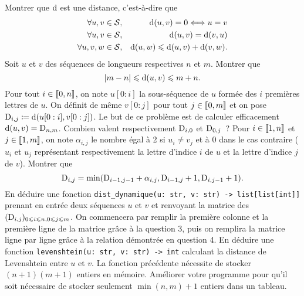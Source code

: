 \documentclass{magnolia}
\begin{document}
\begin{questions}
\question Montrer que ${\rm d}$ est une distance, c'est-à-dire que
  \begin{eqnarray*}
  \forall u,v\in\mathcal{S},& & {\rm d}(u, v) = 0 \ssi u=v\\
  \forall u,v\in\mathcal{S},& & {\rm d}(u, v) = {\rm d}(v, u)\\
  \forall u,v,w\in\mathcal{S},& & {\rm d}(u, w) \leq {\rm d}(u, v) + {\rm d}(v, w).
  \end{eqnarray*}
\question Soit $u$ et $v$ des séquences de longueurs respectives $n$ et $m$. Montrer que
  \[\abs{m-n}\leq {\rm d}(u, v)\leq m + n.\]
\enonce Pour tout $i\in\intere{0}{n}$, on note $u[0:i]$ la sous-séquence de $u$ formée des $i$ premières
  lettres de $u$. On définit de même $v[0:j]$ pour tout $j\in\intere{0}{m}$ et on pose ${\rm D}_{i,j}\defeq
  {\rm d}(u[0:i], v[0:j])$. Le but de ce problème est de calculer efficacement
  ${\rm d}(u,v)={\rm D}_{n, m}$.
\question Combien valent respectivement ${\rm D}_{i, 0}$ et ${\rm D}_{0, j}$~?
\question Pour $i\in\intere{1}{n}$ et $j\in\intere{1}{m}$, on note $\alpha_{i,j}$ le nombre égal à 2 si
  $u_i\neq v_j$ et à 0 dans le cas contraire ($u_i$ et $u_j$ représentant respectivement la lettre d'indice
  $i$ de $u$ et la lettre d'indice $j$ de $v$). Montrer que
  \[{\rm D}_{i, j}=\min({\rm D}_{i-1, j-1}+\alpha_{i,j}, {\rm D}_{i-1, j}+1, {\rm D}_{i, j-1}+1).\]
\question En déduire une fonction \verb!dist_dynamique(u: str, v: str) -> list[list[int]]! prenant
  en entrée deux séquences $u$ et $v$ et renvoyant la matrice des $({\rm D}_{i,j})_{0\leq i\leq n, 0\leq j\leq m}$.
  On commencera par remplir la première colonne et la première ligne de la matrice grâce à la question 3, puis
  on remplira la matrice ligne par ligne grâce à la relation démontrée en question 4.
\question En déduire une fonction \verb!levenshtein(u: str, v: str) -> int! calculant la distance de Levenshtein
  entre $u$ et $v$.
\question La fonction précédente nécessite de stocker $(n+1)(m+1)$ entiers en mémoire. Améliorer votre
 programme pour qu'il soit nécessaire de stocker seulement $\min(n, m)+1$ entiers dans un tableau.
\end{questions}
\end{document}
